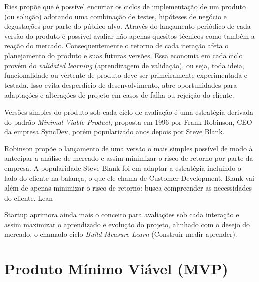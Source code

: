 \par Ries propõe que é possível encurtar os ciclos de implementação de um produto (ou solução) adotando uma combinação de testes, hipóteses de negócio e degustações por parte do público-alvo. Através do lançamento periódico de cada versão do produto é possível avaliar não apenas quesitos técnicos como também a reação do mercado. Consequentemente o retorno de cada iteração afeta o planejamento do produto e suas futuras versões. Essa economia em cada ciclo provém do \emph{validated learning} (aprendizagem de validação), ou seja, toda ideia, funcionalidade ou vertente de produto deve ser primeiramente experimentada e testada. Isso evita desperdício de desenvolvimento, abre oportunidades para adaptações e alterações de projeto em casos de falha ou rejeição do cliente.
\par Versões simples do produto sob cada ciclo de avaliação é uma estratégia derivada do padrão \emph{Minimal Viable Product}, proposta em 1996 por Frank Robinson, CEO da empresa SyncDev, porém popularizado anos depois por Steve Blank.
\par Robinson propõe o lançamento de uma versão o mais simples possível de modo à antecipar a análise de mercado e assim minimizar o risco de retorno por parte da empresa. A popularidade Steve Blank foi em adaptar a estratégia incluindo o lado do cliente na balança, o que ele chama de Customer Development. Blank vai além de apenas minimizar o risco de retorno: busca compreender as necessidades do cliente. Lean \par Startup aprimora ainda mais o conceito para avaliações sob cada interação e assim maximizar o aprendizado e evolução do projeto, alinhado com o desejo do mercado, o chamado ciclo \emph{Build-Measure-Learn} (Construir-medir-aprender).

\section{Produto Mínimo Viável (MVP)}

